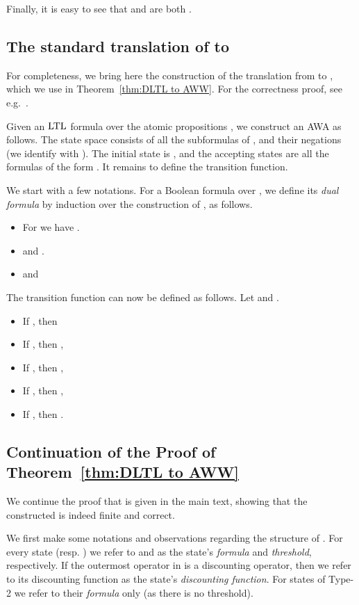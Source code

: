 \documentclass{llncs}
\newcommand{\LTL}{{\ensuremath{\rm LTL}}\xspace}
\newcommand{\AWW}{\mbox{\rm AWA}\xspace}
\begin{document}
Finally, it is easy to see that  and  are both .


\subsection{The standard translation of  to }
\label{apx: standard LTL to AWW}
For completeness, we bring here the construction of the translation from  to , which we use in Theorem~\ref{thm:DLTL to AWW}. For the correctness proof, see e.g.~\cite{Var96}.

Given an \LTL formula  over the atomic propositions , we construct an \AWW  as follows. The state space  consists of all the subformulas of , and their negations (we identify  with ). The initial state is , and the accepting states are all the formulas of the form . It remains to define the transition function.

We start with a few notations. For a Boolean formula  over , we define its {\em dual formula}  by induction over the construction of , as follows.
\begin{itemize}
\item For  we have .
\item  and .
\item  and 
\end{itemize}
The transition function can now be defined as follows. Let  and .
\begin{itemize}
\item If , then 
\item If , then ,
\item If , then ,
\item If , then ,
\item If , then .
\end{itemize}


\subsection{Continuation of the Proof of Theorem~\ref{thm:DLTL to AWW}}
We continue the proof that is given in the main text, showing that the constructed   is indeed finite and correct.

We first make some notations and observations regarding the structure of . For every state  (resp. ) we refer to  and  as the state's {\em formula} and {\em threshold}, respectively. If the outermost operator in  is a discounting operator, then we refer to its discounting function as the state's {\em discounting function}. For states of Type-2 we refer to their {\em formula} only (as there is no threshold).
\end{document}
